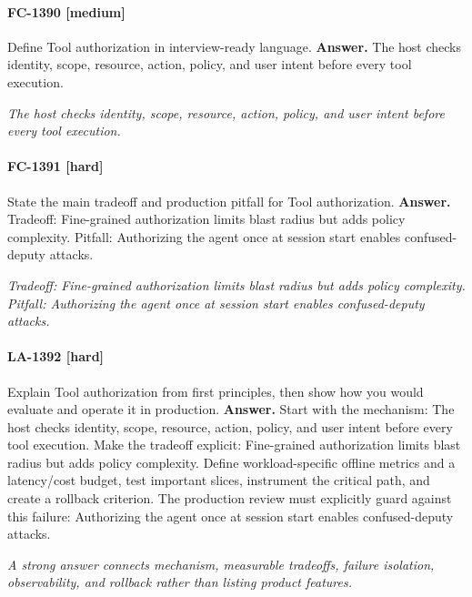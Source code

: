 \paragraph{FC-1390 [medium]} Define Tool authorization in interview-ready language.
\noindent\textbf{Answer.} The host checks identity, scope, resource, action, policy, and user intent before every tool execution.
\par\textit{The host checks identity, scope, resource, action, policy, and user intent before every tool execution.}
\paragraph{FC-1391 [hard]} State the main tradeoff and production pitfall for Tool authorization.
\noindent\textbf{Answer.} Tradeoff: Fine-grained authorization limits blast radius but adds policy complexity. Pitfall: Authorizing the agent once at session start enables confused-deputy attacks.
\par\textit{Tradeoff: Fine-grained authorization limits blast radius but adds policy complexity. Pitfall: Authorizing the agent once at session start enables confused-deputy attacks.}
\paragraph{LA-1392 [hard]} Explain Tool authorization from first principles, then show how you would evaluate and operate it in production.
\noindent\textbf{Answer.} Start with the mechanism: The host checks identity, scope, resource, action, policy, and user intent before every tool execution. Make the tradeoff explicit: Fine-grained authorization limits blast radius but adds policy complexity. Define workload-specific offline metrics and a latency/cost budget, test important slices, instrument the critical path, and create a rollback criterion. The production review must explicitly guard against this failure: Authorizing the agent once at session start enables confused-deputy attacks.
\par\textit{A strong answer connects mechanism, measurable tradeoffs, failure isolation, observability, and rollback rather than listing product features.}
